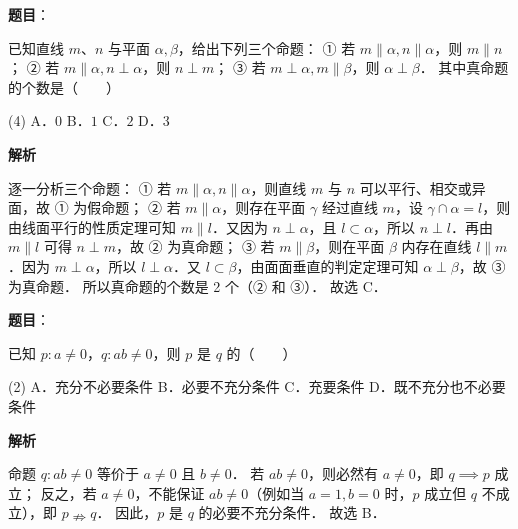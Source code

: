 \begin{answer}

\textbf{题目}：

已知直线 $m$、$n$ 与平面 $\alpha, \beta$，给出下列三个命题：
① 若 $m \parallel \alpha, n \parallel \alpha$，则 $m \parallel n$；
② 若 $m \parallel \alpha, n \perp \alpha$，则 $n \perp m$；
③ 若 $m \perp \alpha, m \parallel \beta$，则 $\alpha \perp \beta$．
其中真命题的个数是\mbox{（　　）}

\begin{gkopts}(4)
\task A．$0$
\task B．$1$
\task C．$2$
\task D．$3$
\end{gkopts}

\textbf{解析}

逐一分析三个命题：
① 若 $m \parallel \alpha, n \parallel \alpha$，则直线 $m$ 与 $n$ 可以平行、相交或异面，故 ① 为假命题；
② 若 $m \parallel \alpha$，则存在平面 $\gamma$ 经过直线 $m$，设 $\gamma \cap \alpha = l$，则由线面平行的性质定理可知 $m \parallel l$．又因为 $n \perp \alpha$，且 $l \subset \alpha$，所以 $n \perp l$．再由 $m \parallel l$ 可得 $n \perp m$，故 ② 为真命题；
③ 若 $m \parallel \beta$，则在平面 $\beta$ 内存在直线 $l \parallel m$．因为 $m \perp \alpha$，所以 $l \perp \alpha$．又 $l \subset \beta$，由面面垂直的判定定理可知 $\alpha \perp \beta$，故 ③ 为真命题．
所以真命题的个数是 2 个（② 和 ③）．
故选 C．


\end{answer}
\begin{answer}

\textbf{题目}：

已知 $p: a \neq 0$，$q: ab \neq 0$，则 $p$ 是 $q$ 的\mbox{（　　）}

\begin{gkopts}(2)
\task A．充分不必要条件
\task B．必要不充分条件
\task C．充要条件
\task D．既不充分也不必要条件
\end{gkopts}

\textbf{解析}

命题 $q: ab \neq 0$ 等价于 $a \neq 0$ 且 $b \neq 0$．
若 $ab \neq 0$，则必然有 $a \neq 0$，即 $q \implies p$ 成立；
反之，若 $a \neq 0$，不能保证 $ab \neq 0$（例如当 $a = 1, b = 0$ 时，$p$ 成立但 $q$ 不成立），即 $p \nRightarrow q$．
因此，$p$ 是 $q$ 的必要不充分条件．
故选 B．


\end{answer}
